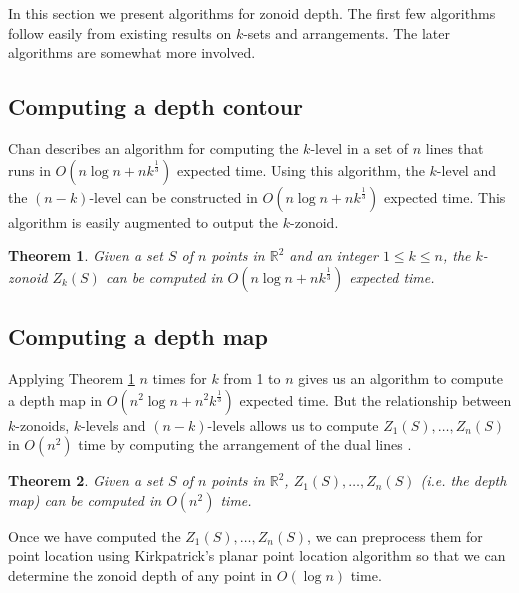 \documentclass{elsart}
\newtheorem{theorem}{Theorem}
\begin{document}
In this section we present algorithms for zonoid depth. The first few
algorithms follow easily from existing results on $k$-sets and
arrangements. The later algorithms are somewhat more involved.

\subsection{Computing a depth contour}
\label{subsection_computing_a_depth_countour}

Chan \cite{remarks_on_klevel_algorithms_in_the_plane} describes an
algorithm for computing the $k$-level in a set of $n$ lines that runs
in $O(n \log n + nk^{\frac{1}{3}})$ expected time. Using this
algorithm, the $k$-level and the $(n-k)$-level can be constructed in
$O(n \log n + nk^{\frac{1}{3}})$ expected time. This algorithm is
easily augmented to output the $k$-zonoid. 

\begin{theorem}\label{theorem_build_k_zonoid}
Given a set $S$ of $n$ points in $\mathbb{R}^2$ and an integer $1 \le
k \le n$, the $k$-zonoid $Z_k(S)$ can be computed in $O(n \log n +
nk^{\frac{1}{3}})$ expected time.
\end{theorem}


\subsection{Computing a depth map}\label{subsection_computing_a_depth_map}

Applying Theorem \ref{theorem_build_k_zonoid} $n$ times for $k$ from 1
to $n$ gives us an algorithm to compute a depth map in $O(n^2 \log n +
n^2 k^{\frac{1}{3}})$ expected time. But the relationship between
$k$-zonoids, $k$-levels and $(n-k)$-levels allows us to compute
$Z_1(S),\ldots,Z_n(S)$ in $O(n^2)$ time by computing the arrangement
of the dual lines \cite{edelsbrunner_book}.

\begin{theorem}\label{theorem_build_1_to_n_zonoids}
Given a set $S$ of $n$ points in $\mathbb{R}^2$,
$Z_1(S),\ldots,Z_n(S)$ (i.e. the depth map) can be computed in
$O(n^2)$ time.
\end{theorem}

Once we have computed the $Z_1(S),\ldots,Z_n(S)$, we can preprocess
them for point location using Kirkpatrick's planar point location
algorithm \cite{optimal_search_in_planar_subdivisions} so that we can
determine the zonoid depth of any point in $O(\log n)$ time. 
\end{document}
